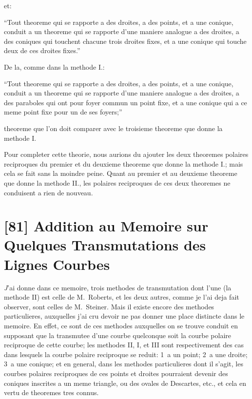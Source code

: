 \documentclass[11pt,a4paper]{book}
\begin{document}
et:

``Tout theoreme qui se rapporte a des droites, a des points, et a une conique, conduit a un theoreme qui se rapporte d'une maniere analogue a des droites, a des coniques qui touchent chacune trois droites fixes, et a une conique qui touche deux de ces droites fixes.''

De la, comme dans la methode I.:

``Tout theoreme qui se rapporte a des droites, a des points, et a une conique, conduit a un theoreme qui se rapporte d'une maniere analogue a des droites, a des paraboles qui ont pour foyer commun un point fixe, et a une conique qui a ce meme point fixe pour un de ses foyers;''

theoreme que l'on doit comparer avec le troisieme theoreme que donne la methode I.

Pour completer cette theorie, nous aurions du ajouter les deux theoremes polaires reciproques du premier et du deuxieme theoreme que donne la methode I.; mais cela se fait sans la moindre peine. Quant au premier et au deuxieme theoreme que donne la methode II., les polaires reciproques de ces deux theoremes ne conduisent a rien de nouveau.


\newpage
\section*{[81] Addition au Memoire sur Quelques Transmutations des Lignes Courbes}

\bigskip

\textit{J}'ai donne dans ce memoire, trois methodes de transmutation dont l'une (la methode II) est celle de M.~Roberts, et les deux autres, comme je l'ai deja fait observer, sont celles de M.~Steiner. Mais il existe encore des methodes particulieres, auxquelles j'ai cru devoir ne pas donner une place distincte dans le memoire. En effet, ce sont de ces methodes auxquelles on se trouve conduit en supposant que la transmutee d'une courbe quelconque soit la courbe polaire reciproque de cette courbe; les methodes II, I, et III sont respectivement des cas dans lesquels la courbe polaire reciproque se reduit: 1\textdegree\ a un point; 2\textdegree\ a une droite; 3\textdegree\ a une conique; et en general, dans les methodes particulieres dont il s'agit, les courbes polaires reciproques de ces points et droites pourraient devenir des coniques inscrites a un meme triangle, ou des ovales de Descartes, etc., et cela en vertu de theoremes tres connus.
\end{document}

